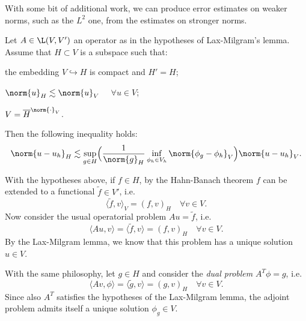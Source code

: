With some bit of additional work, we can produce error estimates on weaker norms, such as the $L^2$ one, from the estimates on stronger norms.
\begin{lemma}[Nitsche] \label{lemma:nitsche}
Let $A \in \L(V,V')$ an operator as in the hypotheses of Lax-Milgram's lemma. Assume that $H \subset V$ is a subspace such that:
\begin{romanlist}
\item the embedding $V \hookrightarrow H$ is compact and $H' = H$;
\item $\norm{u}_H \lesssim \norm{u}_V$ $\quad \forall u \in V$;
\item $V = \overline{H}^{\norm{\cdot}_V}$.
\end{romanlist}
Then the following inequality holds:
\begin{equation}\label{eqn:nitsche_lemma}
\norm{u-u_h}_H \lesssim \sup_{g \in H} \Bigl( \frac{1}{\norm{g}_H} \inf_{\phi_h \in V_h} \norm{\phi_g - \phi_h}_V \Bigr) \norm{u-u_h}_V .
\end{equation}
\end{lemma}

\begin{remark}
With the hypotheses above, if $f \in H$, by the Hahn-Banach theorem $f$ can be extended to a functional $\tilde{f} \in V'$, i.e.
\[
\langle \tilde{f}, v \rangle_V = (f, v)_H \quad \forall v \in V.
\]
Now consider the usual operatorial problem $A u = \tilde{f}$, i.e.
\begin{equation}
\langle Au,v \rangle = \langle \tilde{f},v \rangle = (f, v)_H \quad \forall v\in V.
\end{equation}
By the Lax-Milgram lemma, we know that this problem has a unique solution $u \in V$.

With the same philosophy, let $g \in H$ and consider the \emph{dual problem} $A^T \phi = g$, i.e.
\begin{equation}
\langle Av,\phi \rangle = \langle \tilde{g},v \rangle = (g, v)_H \quad \forall v\in V.
\end{equation}
Since also $A^T$ satisfies the hypotheses of the Lax-Milgram lemma, the adjoint problem admits itself a unique solution $\phi_g \in V$.
\end{remark}

